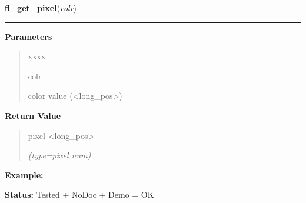 \hspace{.8\funcindent}\begin{boxedminipage}{\funcwidth}

    \raggedright \textbf{fl\_get\_pixel}(\textit{colr})

    \vspace{-1.5ex}

    \rule{\textwidth}{0.5\fboxrule}
\setlength{\parskip}{2ex}
\setlength{\parskip}{1ex}
      \textbf{Parameters}
      \vspace{-1ex}

      \begin{quote}
        \begin{Ventry}{xxxx}

          \item[colr]

          color value ({\textless}long\_pos{\textgreater})

        \end{Ventry}

      \end{quote}

      \textbf{Return Value}
    \vspace{-1ex}

      \begin{quote}
      pixel {\textless}long\_pos{\textgreater}

      {\it (type=pixel num)}

      \end{quote}

\textbf{Example:} 

\textbf{Status:} Tested + NoDoc + Demo = OK



    \end{boxedminipage}

    \label{xformslib:library:fl_get_pixel}

    \vspace{0.5ex}

